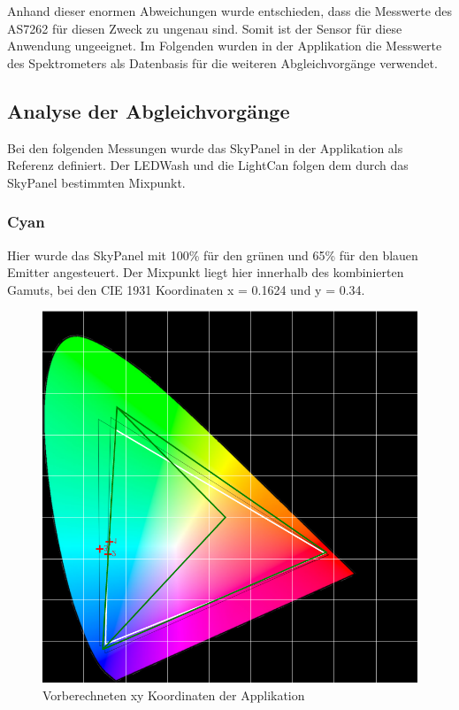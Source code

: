 \documentclass[11pt]{scrartcl}
\begin{document}
\noindent
Anhand dieser enormen Abweichungen wurde entschieden, dass die Messwerte des AS7262 für diesen Zweck zu ungenau sind. Somit ist
der Sensor für diese Anwendung ungeeignet. Im Folgenden wurden in der Applikation die Messwerte des Spektrometers als Datenbasis
für die weiteren Abgleichvorgänge verwendet.
\subsection{Analyse der Abgleichvorgänge}
Bei den folgenden Messungen wurde das SkyPanel in der Applikation als Referenz definiert. Der LEDWash und die LightCan folgen
dem durch das SkyPanel bestimmten Mixpunkt.
\subsubsection{Cyan}
Hier wurde das SkyPanel mit 100\% für den grünen und 65\% für den blauen Emitter angesteuert. Der Mixpunkt liegt hier innerhalb des
kombinierten Gamuts, bei den CIE 1931 Koordinaten x = 0.1624 und y = 0.34.
\begin{figure}[H]
    \begin{center}
        \includegraphics[width=.8\textwidth]{images/app_mix_cyan_cie.png}
    \end{center}
    \caption{Vorberechneten xy Koordinaten der Applikation}
\end{figure}
\noindent
\end{document}
